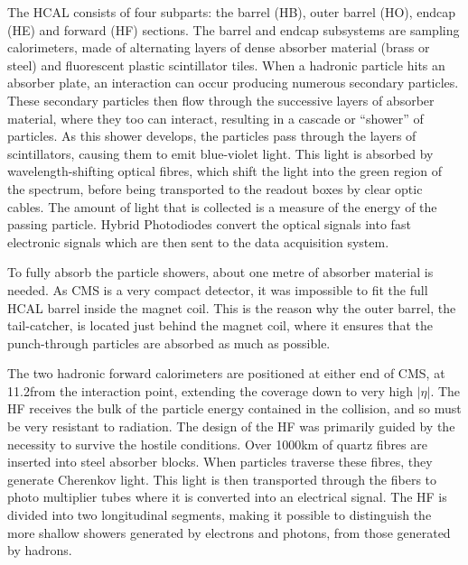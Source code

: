 The HCAL consists of four subparts: the barrel (HB), outer barrel (HO), endcap (HE) and forward
(HF) sections. The barrel and endcap subsystems are sampling calorimeters, made of alternating
layers of dense absorber material (brass or steel) and fluorescent plastic scintillator tiles.
When a hadronic particle hits an absorber plate, an interaction can occur producing numerous
secondary particles. These secondary particles then flow through the successive layers of absorber
material, where they too can interact, resulting in a cascade or “shower” of particles.
As this shower develops, the particles pass through the layers of scintillators, causing them to
emit blue-violet light. This light is absorbed by wavelength-shifting optical fibres, which shift
the light into the green region of the spectrum, before being transported to the readout boxes by
clear optic cables. The amount of light that is collected is a measure of the energy of the passing
particle. Hybrid Photodiodes convert the optical signals into fast electronic signals which are
then sent to the data acquisition system. 

To fully absorb the particle showers, about one metre of absorber material is needed. As CMS is a
very compact detector, it was impossible to fit the full HCAL barrel inside the magnet coil. This
is the reason why the outer barrel, the tail-catcher, is located just behind the magnet coil, where
it ensures that the punch-through particles are absorbed as much as possible.  

The two hadronic forward calorimeters are positioned at either end of CMS, at 11.2\meter from
the interaction point, extending the coverage down to very high $|\eta|$. 
The HF receives the bulk of the particle energy contained in the collision, and so must be very
resistant to radiation. The design of the HF was primarily guided by the necessity to survive the
hostile conditions. Over 1000\unit{km} of quartz fibres are inserted into steel absorber
blocks. When particles traverse these fibres, they generate Cherenkov light. This light is then
transported through the fibers to photo multiplier tubes where it is converted into an electrical
signal. 
The HF is divided into two longitudinal segments, making it possible to distinguish the more shallow
showers generated by electrons and photons, from those generated by hadrons.

